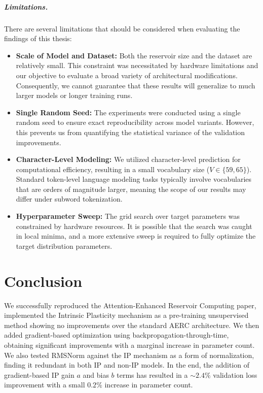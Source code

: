 \documentclass{sapthesis}
\begin{document}
\paragraph{Limitations.} There are several limitations that should be considered when evaluating the findings of this thesis:
\begin{itemize}
  \item \textbf{Scale of Model and Dataset:} Both the reservoir size and the dataset are relatively small. This constraint was necessitated by hardware limitations and our objective to evaluate a broad variety of architectural modifications. Consequently, we cannot guarantee that these results will generalize to much larger models or longer training runs.
  \item \textbf{Single Random Seed:} The experiments were conducted using a single random seed to ensure exact reproducibility across model variants. However, this prevents us from quantifying the statistical variance of the validation improvements.
  \item \textbf{Character-Level Modeling:} We utilized character-level prediction for computational efficiency, resulting in a small vocabulary size ($V \in \{59, 65\}$). Standard token-level language modeling tasks typically involve vocabularies that are orders of magnitude larger, meaning the scope of our results may differ under subword tokenization.
  \item \textbf{Hyperparameter Sweep:} The grid search over target parameters was constrained by hardware resources. It is possible that the search was caught in local minima, and a more extensive sweep is required to fully optimize the target distribution parameters.
\end{itemize}

\chapter{Conclusion}
We successfully reproduced the Attention-Enhanced Reservoir Computing paper, implemented the Intrinsic Plasticity mechanism as a pre-training unsupervised method showing no improvements over the standard AERC architecture. We then added gradient-based optimization using backpropagation-through-time, obtaining significant improvements with a marginal increase in parameter count. We also tested RMSNorm against the IP mechanism as a form of normalization, finding it redundant in both IP and non-IP models.
In the end, the addition of gradient-based IP gain $a$ and bias $b$ terms has resulted in a $\sim 2.4\%$ validation loss improvement with a small $0.2\%$ increase in parameter count.
\end{document}
